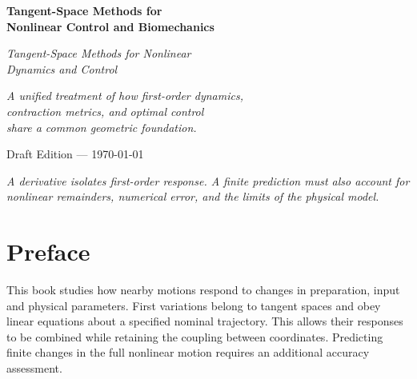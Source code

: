 \documentclass[10pt,letterpaper,openany]{book}
\theoremstyle{plain}
\theoremstyle{definition}
\theoremstyle{remark}
\begin{document}
\hypersetup{pageanchor=false}

\begin{titlepage}
\centering
\vspace*{2cm}

{\Huge\bfseries Tangent-Space Methods for\\[6pt]
Nonlinear Control and Biomechanics\par}

\vspace{1.5cm}

{\Large\itshape Tangent-Space Methods for Nonlinear\\[4pt]
Dynamics and Control\par}

\vspace{3cm}


\vspace{2cm}

{\large\itshape
A unified treatment of how first-order dynamics,\\[4pt]
contraction metrics, and optimal control\\[4pt]
share a common geometric foundation.\par}

\vfill

{\large Draft Edition --- \today\par}
\end{titlepage}

\frontmatter
\hypersetup{pageanchor=true}

\thispagestyle{empty}
\vspace*{\fill}
\begin{center}
\begin{minipage}{0.7\textwidth}
\centering
\itshape
A derivative isolates first-order response. A finite prediction must also account
for nonlinear remainders, numerical error, and the limits of the physical model.
\end{minipage}
\end{center}
\vspace*{\fill}
\newpage

\chapter{Preface}

This book studies how nearby motions respond to changes in preparation, input and physical parameters. First variations belong to tangent spaces and obey linear equations about a specified nominal trajectory. This allows their responses to be combined while retaining the coupling between coordinates. Predicting finite changes in the full nonlinear motion requires an additional accuracy assessment.
\end{document}
